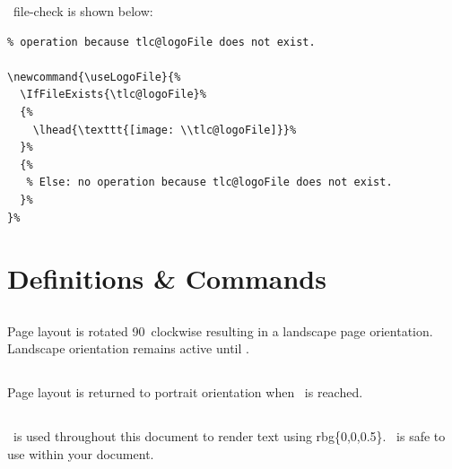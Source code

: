 \documentclass[12pt]{tlc-article}
\begin{document}
\tlcVspace

\tlcA\ file-check is shown below:

\begin{lstlisting}[basicstyle=\tiny]
% Typeset the logo in the left side of the document header.  Otherwise no
% operation because tlc@logoFile does not exist.

\newcommand{\useLogoFile}{%
  \IfFileExists{\tlc@logoFile}%
  {%
    \lhead{\texttt{[image: \\tlc@logoFile]}}%
  }%
  {%
   % Else: no operation because tlc@logoFile does not exist.
  }%
}%
\end{lstlisting}


\section{Definitions \& Commands}


\subsection{\tlcBL}
Page layout is rotated 90\textdegree\ clockwise resulting in a landscape page
orientation.  Landscape orientation remains active until \tlcEL.


\subsection{\tlcEL}
Page layout is returned to portrait orientation when \tlcEL\ is reached.


\subsection{\tlcDB}
\tlcDB\ is used throughout this document to render text using rbg\{0,0,0.5\}.
\tlcDB\ is safe to use within your document.

\end{document}
